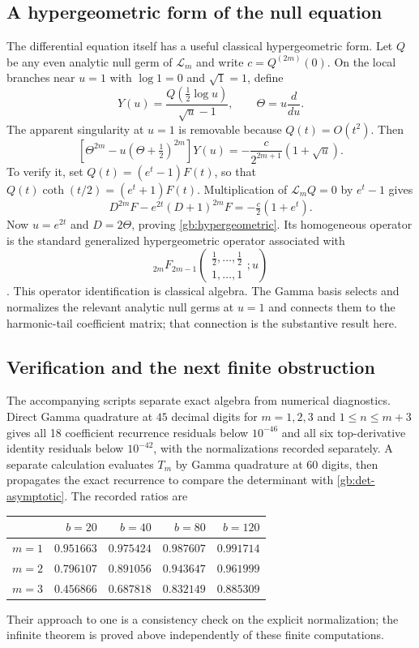 \subsection{A hypergeometric form of the null equation}

The differential equation itself has a useful classical
hypergeometric form.  Let $Q$ be any even analytic null germ of
$\mathcal L_m$ and write $c=Q^{(2m)}(0)$.  On the local branches
near $u=1$ with $\log1=0$ and $\sqrt1=1$, define
\[
 Y(u)=\frac{Q(\tfrac12\log u)}{\sqrt u-1},\qquad
                    \Theta=u\frac{d}{du}.
\]
The apparent singularity at $u=1$ is removable because $Q(t)=O(t^2)$.
Then
\begin{equation}\label{gb:hypergeometric}
 \left[\Theta^{2m}-u(\Theta+\tfrac12)^{2m}\right]Y(u)
            =-\frac{c}{2^{2m+1}}(1+\sqrt u).
\end{equation}
To verify it, set $Q(t)=(e^t-1)F(t)$, so that
$Q(t)\coth(t/2)=(e^t+1)F(t)$.  Multiplication of
$\mathcal L_mQ=0$ by $e^t-1$ gives
\[
 D^{2m}F-e^{2t}(D+1)^{2m}F=-\tfrac c2(1+e^t).
\]
Now $u=e^{2t}$ and $D=2\Theta$, proving
\eqref{gb:hypergeometric}.  Its homogeneous operator is the standard
generalized hypergeometric operator associated with
\[
 {}_{2m}F_{2m-1}
 \left(\begin{matrix}\tfrac12,\ldots,\tfrac12\\1,\ldots,1\end{matrix};u\right)
\]
\cite{dlmf-hypergeometric}.  This operator identification is classical
algebra.  The Gamma basis selects and normalizes the relevant
analytic null germs at $u=1$ and connects them to the harmonic-tail
coefficient matrix; that connection is the substantive result here.

\subsection{Verification and the next finite obstruction}

The accompanying scripts separate exact algebra from numerical
diagnostics.  Direct Gamma quadrature at $45$ decimal digits for
$m=1,2,3$ and $1\le n\le m+3$ gives all 18 coefficient recurrence
residuals below $10^{-46}$ and all six top-derivative identity
residuals below $10^{-42}$, with the normalizations recorded
separately. A separate calculation evaluates $T_m$
by Gamma quadrature at $60$ digits, then propagates the exact
recurrence to compare the determinant with
\eqref{gb:det-asymptotic}.  The recorded ratios are
\begin{center}
\begin{tabular}{@{}crrrr@{}}
\toprule
 & $b=20$ & $b=40$ & $b=80$ & $b=120$\\
\midrule
$m=1$ & $0.951663$ & $0.975424$ & $0.987607$ & $0.991714$\\
$m=2$ & $0.796107$ & $0.891056$ & $0.943647$ & $0.961999$\\
$m=3$ & $0.456866$ & $0.687818$ & $0.832149$ & $0.885309$\\
\bottomrule
\end{tabular}
\end{center}
Their approach to one is a consistency check on the explicit
normalization; the infinite theorem is proved above independently
of these finite computations.

